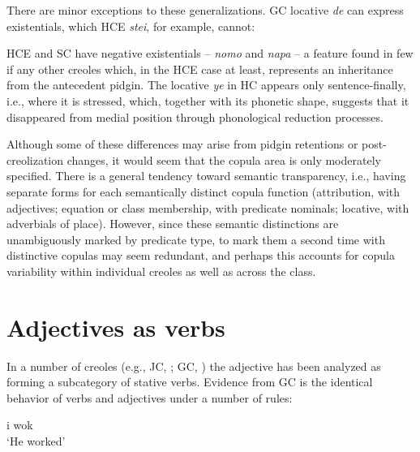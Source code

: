 There are minor exceptions to these generalizations. GC locative \textit{de} can express existentials, which HCE \textit{stei}, for example, cannot:

\z

\z

\z
HCE and SC have negative existentials -- \textit{nomo} and \textit{napa} -- a feature found in few if any other creoles which, in the HCE case at least, represents an inheritance from the antecedent pidgin. The locative \textit{ye} in HC appears only sentence-finally, i.e., where it is stressed, which, together with its phonetic shape, suggests that it disappeared from medial position through phonological reduction processes.


Although some of these differences may arise from pidgin retentions or post-creolization changes, it would seem that the copula area is only moderately specified. There is a general tendency toward semantic transparency, i.e., having separate forms for each semantically distinct copula function (attribution, with adjectives; equation or class membership, with predicate nominals; locative, with adverbials of place). However, since these semantic distinctions are unambiguously marked by predicate type, to mark them a second time with distinc\-tive copulas may seem redundant, and perhaps this accounts for copula variability within individual creoles as well as across the class.

\section{Adjectives as verbs}

In a number of creoles (e.g., JC, \citealt{Bailey1966}; GC, \citealt{Bickerton1973a}) the adjective has been analyzed as forming a subcategory of stative verbs. Evidence from GC is the identical behavior of verbs and adjectives under a number of rules:

\ea\label{ex:2:63}
 {i} {wok}\\
\glt `He worked'
\z

